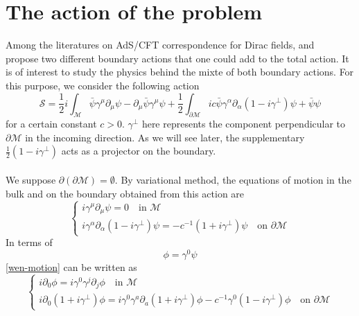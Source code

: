 \section{The action of the problem}
Among the literatures on AdS/CFT correspondence for Dirac fields,
\cite{Henningson1998} and~\cite{Contino2005} propose two different boundary actions that one could add to the total action.
It is of interest to study the physics behind the mixte of both boundary actions. 
For this purpose,
we consider the following action
\begin{equation}\label{wen-action}
\mathcal{S} = \frac{1}{2}i\int_{\mathcal{M}} \bar{\psi} \gamma^\mu \partial_\mu \psi - \partial_\mu \bar{\psi} \gamma^\mu \psi 
+ \frac{1}{2}\int_{\partial \mathcal{M}} ic \bar{\psi} \gamma^\alpha \partial_\alpha (1 - i \gamma^\bot) \psi
+ \bar{\psi} \psi
\end{equation}
for a certain constant $c >0$. 
$\gamma^\bot$ here represents the component perpendicular to $\partial \mathcal{M}$ in the incoming direction. 
As we will see later, the supplementary $\frac 1 2 (1-i\gamma^\bot)$ acts as a projector on the boundary.
\\\\
We suppose $\partial(\partial \mathcal{M}) = \emptyset$.
By variational method, the equations of motion in the bulk and on the boundary obtained from this action are
\begin{equation}\label{wen-motion}
\begin{cases}
i \gamma^\mu \partial_\mu \psi = 0  \quad \textrm{in $\mathcal{M}$}\\
i \gamma^\alpha \partial_\alpha (1 - i\gamma^\bot) \psi = - c^{-1}(1 + i\gamma^{\bot}) \psi \quad \textrm{on $\partial \mathcal{M}$}
\end{cases}
\end{equation}
In terms of 
\begin{equation*}
\phi = \gamma^0 \psi
\end{equation*}
\cref{wen-motion} can be written as 
\begin{equation}\label{wen-maineq}
\begin{cases}
i \partial_0 \phi = i \gamma^0 \gamma^j \partial_j \phi   \quad \textrm{in $\mathcal{M}$}\\
i \partial_0(1 + i\gamma^\bot) \phi = i\gamma^0 \gamma^a \partial_a (1+ i\gamma^\bot)\phi - c^{-1} \gamma^0(1 - i \gamma^{\bot})\phi \quad \textrm{on $\partial \mathcal{M}$}
\end{cases}
\end{equation}
